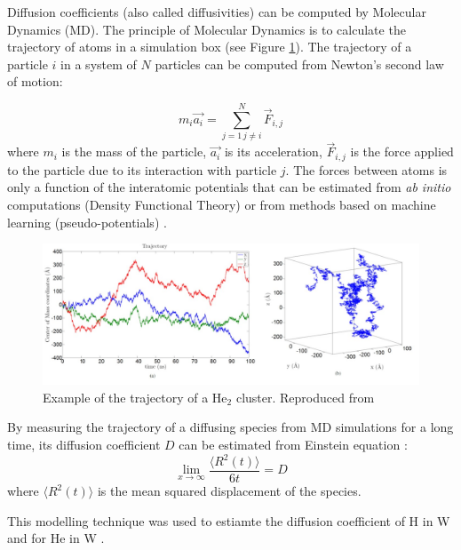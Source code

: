 Diffusion coefficients (also called diffusivities) can be computed by Molecular Dynamics (MD).
The principle of Molecular Dynamics is to calculate the trajectory of atoms in a simulation box (see Figure \ref{fig: md faney}).
The trajectory of a particle $i$ in a system of $N$ particles can be computed from Newton's second law of motion:

\begin{equation}
    m_i \vec{a_i} = \sum_{j=1 \, j \neq i}^N \vec{F}_{i,j}
\end{equation}
where $m_i$ is the mass of the particle, $\vec{a_i}$ is its acceleration, $\vec{F}_{i,j}$ is the force applied to the particle due to its interaction with particle $j$.
The forces between atoms is only a function of the interatomic potentials that can be estimated from \textit{ab initio} computations (Density Functional Theory)  or from methods based on machine learning (pseudo-potentials) .

\begin{figure} [h!]
    \centering
    \includegraphics[width=\linewidth]{Figures/Chapter1/faney_md.jpg}
    \caption{Example of the trajectory of a He$_2$ cluster. Reproduced from \cite{faney_numerical_2013}}
    \label{fig: md faney}
\end{figure}

By measuring the trajectory of a diffusing species from MD simulations for a long time, its diffusion coefficient $D$ can be estimated from Einstein equation \cite{einstein_uber_1905}:
\begin{equation}
    \lim_{x\to\infty} \frac{\langle R^2(t) \rangle}{6t} = D
\end{equation}
where $\langle R^2(t) \rangle$ is the mean squared displacement of the species.

This modelling technique was used to estiamte the diffusion coefficient of H in W  and for He in W .

